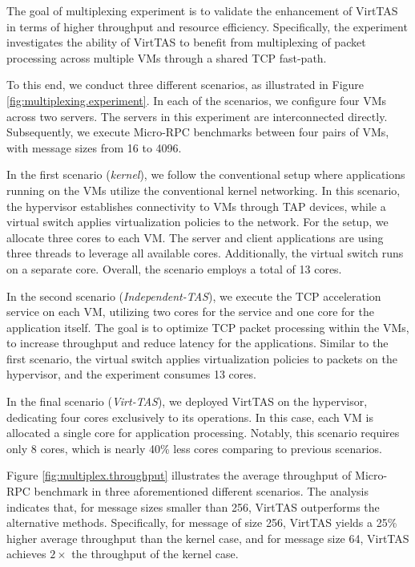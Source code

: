 The goal of multiplexing experiment is to validate the enhancement of VirtTAS in terms of 
higher throughput and resource efficiency. Specifically, the experiment 
investigates the ability of VirtTAS to benefit from multiplexing of packet processing 
across multiple VMs through a shared TCP fast-path. 

To this end, we conduct three different scenarios, as illustrated in Figure 
\ref{fig:multiplexing.experiment}. In each of the scenarios, we configure four 
VMs across two servers. The servers in this experiment are interconnected directly. 
Subsequently, we execute Micro-RPC benchmarks between four pairs of VMs, 
with message sizes from 16 to 4096.


In the first scenario (\emph{kernel}), we follow the conventional 
setup where applications running on the VMs utilize the conventional kernel 
networking. In this scenario, the hypervisor establishes connectivity to VMs through 
TAP devices, while a virtual switch applies virtualization policies to the network. 
For the setup, we allocate three cores to each VM. The server and client applications 
are using three threads to leverage all available cores. 
Additionally, the virtual switch runs on a separate core. Overall, the scenario employs
a total of 13 cores. 

In the second scenario (\emph{Independent-TAS}), we execute the TCP acceleration service on each VM, 
utilizing two cores for the service and one core for the application itself. 
The goal is to optimize TCP packet processing within the VMs, 
to increase throughput and reduce latency for the applications. 
Similar to the first scenario, the virtual switch applies virtualization policies 
to packets on the hypervisor, and the experiment consumes 13 cores.


In the final scenario (\emph{Virt-TAS}), we deployed VirtTAS on the hypervisor, dedicating four 
cores exclusively to its operations. In this case, each VM is allocated a single 
core for application processing. Notably, this scenario requires only 8 cores,
which is nearly 40\% less cores comparing to previous scenarios.


Figure \ref{fig:multiplex.throughput} illustrates the average throughput of 
Micro-RPC benchmark in three aforementioned different scenarios. 
The analysis indicates that, for message sizes smaller than 256, VirtTAS outperforms 
the alternative methods. Specifically, for message of size 256, VirtTAS yields
a 25\% higher average throughput than the kernel case, and for message size 64, 
VirtTAS achieves \(2\times\) the throughput of the kernel case.

